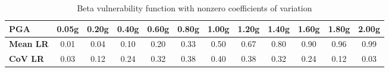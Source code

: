 \begin{table}[htbp]

\centering
\begin{tabular}{ l c c c c c c c c c c c}

\hline
\rowcolor{anti-flashwhite}
\bf{PGA} & \bf{0.05g} & \bf{0.20g} & \bf{0.40g} & \bf{0.60g} & \bf{0.80g} & \bf{1.00g} & \bf{1.20g} & \bf{1.40g} & \bf{1.60g} & \bf{1.80g} & \bf{2.00g} \\
\hline
\bf{Mean LR} & 0.01 & 0.04 & 0.10 & 0.20 & 0.33 & 0.50 & 0.67 & 0.80 & 0.90 & 0.96 & 0.99 \\
\bf{CoV LR} & 0.03 & 0.12 & 0.24 & 0.32 & 0.38 & 0.40 & 0.38 & 0.32 & 0.24 & 0.12 & 0.03 \\
\hline
\end{tabular}

\caption{Beta vulnerability function with nonzero coefficients of variation}
\label{tab:vf-bt-tax1-nzcov}
\end{table}